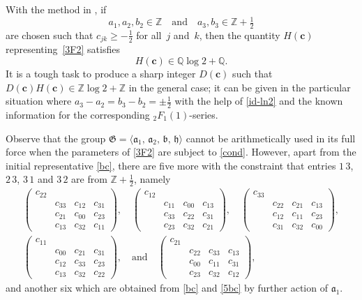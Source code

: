 \documentclass[12pt,reqno]{amsart}
\newcommand{\bc}{{\boldsymbol c}}
\newcommand{\fa}{{\mathfrak a}}
\newcommand{\fb}{{\mathfrak b}}
\newcommand{\fh}{{\mathfrak h}}
\newcommand{\fG}{{\mathfrak G}}
\begin{document}
With the method in \cite[Section 3.3]{FZ10}, if
\begin{equation}
a_1,a_2,b_2\in\mathbb Z \quad\text{and}\quad a_3,b_3\in\mathbb Z+\tfrac12
\label{cond}
\end{equation}
are chosen such that $c_{jk}\ge-\frac12$ for all~$j$ and~$k$, 
then the quantity $H(\bc)$ representing~\eqref{3F2} satisfies
$$
H(\bc)\in\mathbb Q\log2+\mathbb Q.
$$
It is a tough task to produce a sharp integer $D(\bc)$ such that $D(\bc)H(\bc)\in\mathbb Z\log2+\mathbb Z$ in the general case;
it can be given in the particular situation
where $a_3-a_2=b_3-b_2=\pm\frac12$ with the help of \eqref{id-ln2} and
the known information for 
the corresponding ${}_2F_1(1)$-series.

Observe that the group $\fG=\langle\fa_1,\,\fa_2,\,\fb,\,\fh\rangle$ cannot be arithmetically used in its full force when
the parameters of \eqref{3F2} are subject to \eqref{cond}. However, apart from the initial representative \eqref{bc},
there are five more with the constraint that entries $1\,3$, $2\,3$, $3\,1$ and $3\,2$ are from $\mathbb Z+\frac12$, namely
\begin{equation}
\begin{gathered}
\begin{pmatrix} c_{22} \\ & c_{33} & c_{12} & c_{31} \\ & c_{21} & c_{00} & c_{23} \\ & c_{13} & c_{32} & c_{11} \end{pmatrix},
\quad
\begin{pmatrix} c_{12} \\ & c_{11} & c_{00} & c_{13} \\ & c_{33} & c_{22} & c_{31} \\ & c_{23} & c_{32} & c_{21} \end{pmatrix},
\quad
\begin{pmatrix} c_{33} \\ & c_{22} & c_{21} & c_{13} \\ & c_{12} & c_{11} & c_{23} \\ & c_{31} & c_{32} & c_{00} \end{pmatrix},
\\
\begin{pmatrix} c_{11} \\ & c_{00} & c_{21} & c_{31} \\ & c_{12} & c_{33} & c_{23} \\ & c_{13} & c_{32} & c_{22} \end{pmatrix},
\quad\text{and}\quad
\begin{pmatrix} c_{21} \\ & c_{22} & c_{33} & c_{13} \\ & c_{00} & c_{11} & c_{31} \\ & c_{23} & c_{32} & c_{12} \end{pmatrix},
\end{gathered}
\label{5bc}
\end{equation}
and another six which are obtained from \eqref{bc} and \eqref{5bc} by further action of $\fa_1$.
\end{document}
